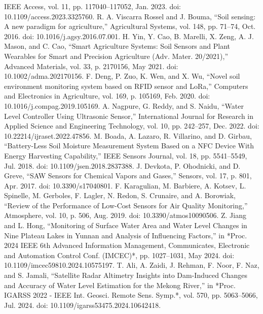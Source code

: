 \documentclass[conference]{IEEEtran}
\begin{document}
\begin{thebibliography}{00}
IEEE Access, vol. 11, pp. 117040--117052, Jan. 2023. doi: 10.1109/access.2023.3325760.
 R. A. Viscarra Rossel and J. Bouma, 
``Soil sensing: A new paradigm for agriculture,'' 
Agricultural Systems, vol. 148, pp. 71--74, Oct. 2016. doi: 10.1016/j.agsy.2016.07.001.
 H. Yin, Y. Cao, B. Marelli, X. Zeng, A. J. Mason, and C. Cao, 
``Smart Agriculture Systems: Soil Sensors and Plant Wearables for Smart and Precision Agriculture (Adv. Mater. 20/2021),'' 
Advanced Materials, vol. 33, p. 2170156, May 2021. doi: 10.1002/adma.202170156.
 F. Deng, P. Zuo, K. Wen, and X. Wu, 
``Novel soil environment monitoring system based on RFID sensor and LoRa,'' 
Computers and Electronics in Agriculture, vol. 169, p. 105169, Feb. 2020. doi: 10.1016/j.compag.2019.105169.
 A. Nagpure, G. Reddy, and S. Naidu, 
``Water Level Controller Using Ultrasonic Sensor,'' 
International Journal for Research in Applied Science and Engineering Technology, vol. 10, pp. 242--257, Dec. 2022. 
doi: 10.22214/ijraset.2022.47856.
 M. Boada, A. Lazaro, R. Villarino, and D. Girbau, 
``Battery-Less Soil Moisture Measurement System Based on a NFC Device With Energy Harvesting Capability,'' 
IEEE Sensors Journal, vol. 18, pp. 5541--5549, Jul. 2018. 
doi: 10.1109/jsen.2018.2837388.
 J. Devkota, P. Ohodnicki, and D. Greve, 
``SAW Sensors for Chemical Vapors and Gases,'' 
Sensors, vol. 17, p. 801, Apr. 2017. 
doi: 10.3390/s17040801.
 F. Karagulian, M. Barbiere, A. Kotsev, L. Spinelle, M. Gerboles, F. Lagler, N. Redon, S. Crunaire, and A. Borowiak, 
``Review of the Performance of Low-Cost Sensors for Air Quality Monitoring,'' 
Atmosphere, vol. 10, p. 506, Aug. 2019. doi: 10.3390/atmos10090506.
 Z. Jiang and L. Hong, 
``Monitoring of Surface Water Area and Water Level Changes in Nine Plateau Lakes in Yunnan and Analysis of Influencing Factors,'' 
in *Proc. 2024 IEEE 6th Advanced Information Management, Communicates, Electronic and Automation Control Conf. (IMCEC)*, 
pp. 1027--1031, May 2024. doi: 10.1109/imcec59810.2024.10575197.
 T. Ali, A. Zaidi, J. Rehman, F. Noor, F. Naz, and S. Jamali, 
``Satellite Radar Altimetry Insights into Dam-Induced Changes and Accuracy of Water Level Estimation for the Mekong River,'' 
in *Proc. IGARSS 2022 - IEEE Int. Geosci. Remote Sens. Symp.*, vol. 570, pp. 5063--5066, Jul. 2024. 
doi: 10.1109/igarss53475.2024.10642418.

\end{thebibliography}
\end{document}
